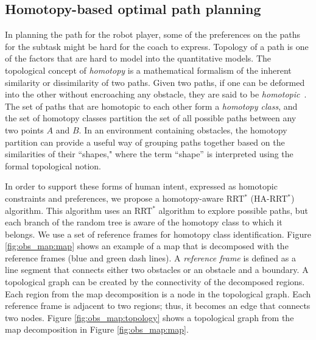 \documentclass[phd]{byuprop}
\begin{document}
\subsection{Homotopy-based optimal path planning}

In planning the path for the robot player, some of the preferences on the paths for the subtask might be hard for the coach to express.
Topology of a path is one of the factors that are hard to model into the quantitative models.
The topological concept of \emph{homotopy} is a mathematical formalism of the inherent similarity or dissimilarity of two paths.
Given two paths, if one can be deformed into the other without encroaching any obstacle, they are said to be \emph{homotopic}~\cite{Hernandez2015}.
The set of paths that are homotopic to each other form a \emph{homotopy class}, and the  set of homotopy classes partition the set of all possible paths between any two points $A$ and $B$.
In an environment containing obstacles, the homotopy partition can provide a useful way of grouping paths together based on the similarities of their ``shapes," where the term ``shape'' is interpreted using the formal topological notion.

In order to support these forms of human intent, expressed as homotopic constraints and preferences, we propose a homotopy-aware RRT$^{*}$ (HA-RRT$^{*}$) algorithm. 
This algorithm uses an RRT$^*$ algorithm to explore possible paths, but each branch of the random tree is aware of the homotopy class to which it belongs. 
We use a set of reference frames for homotopy class identification.
Figure \ref{fig:obs_map:map} shows an example of a map that is decomposed with the reference frames (blue and green dash lines).
A \emph{reference frame} is defined as a line segment that connects either two obstacles or an obstacle and a boundary.
A topological graph can be created by the connectivity of the decomposed regions.
Each region from the map decomposition is a node in the topological graph.
Each reference frame is adjacent to two regions; thus, it becomes an edge that connects two nodes.
Figure \ref{fig:obs_map:topology} shows a topological graph from the map decomposition in Figure \ref{fig:obs_map:map}.
\end{document}
